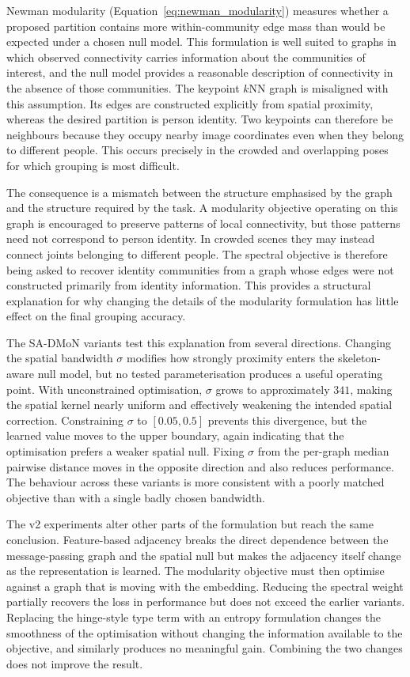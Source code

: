 Newman modularity (Equation~\eqref{eq:newman_modularity}) measures
whether a proposed partition contains more within-community edge mass
than would be expected under a chosen null model.
This formulation is well suited to graphs in which observed connectivity
carries information about the communities of interest,
and the null model provides a reasonable description of connectivity
in the absence of those communities.
The keypoint $k$NN graph is misaligned with this assumption.
Its edges are constructed explicitly from spatial proximity,
whereas the desired partition is person identity.
Two keypoints can therefore be neighbours because they occupy nearby
image coordinates even when they belong to different people.
This occurs precisely in the crowded and overlapping poses for which
grouping is most difficult.

The consequence is a mismatch between the structure emphasised by the
graph and the structure required by the task.
A modularity objective operating on this graph is encouraged to preserve
patterns of local connectivity,
but those patterns need not correspond to person identity.
In crowded scenes they may instead connect joints belonging to different
people.
The spectral objective is therefore being asked to recover identity
communities from a graph whose edges were not constructed primarily
from identity information.
This provides a structural explanation for why changing the details
of the modularity formulation has little effect on the final grouping
accuracy.

The SA-DMoN variants test this explanation from several directions.
Changing the spatial bandwidth $\sigma$ modifies how strongly proximity
enters the skeleton-aware null model,
but no tested parameterisation produces a useful operating point.
With unconstrained optimisation, $\sigma$ grows to approximately $341$,
making the spatial kernel nearly uniform and effectively weakening
the intended spatial correction.
Constraining $\sigma$ to $[0.05,0.5]$ prevents this divergence,
but the learned value moves to the upper boundary,
again indicating that the optimisation prefers a weaker spatial null.
Fixing $\sigma$ from the per-graph median pairwise distance moves
in the opposite direction and also reduces performance.
The behaviour across these variants is more consistent with a poorly
matched objective than with a single badly chosen bandwidth.

The v2 experiments alter other parts of the formulation but reach the
same conclusion.
Feature-based adjacency breaks the direct dependence between the
message-passing graph and the spatial null
but makes the adjacency itself change as the representation is learned.
The modularity objective must then optimise against a graph that is
moving with the embedding.
Reducing the spectral weight partially recovers the loss in performance
but does not exceed the earlier variants.
Replacing the hinge-style type term with an entropy formulation changes
the smoothness of the optimisation without changing the information
available to the objective,
and similarly produces no meaningful gain.
Combining the two changes does not improve the result.

